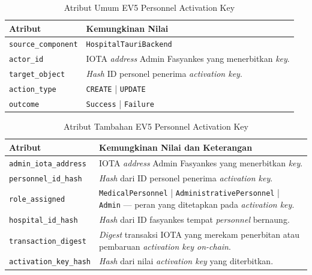 \begin{table}[htbp]
\centering
\caption{Atribut Umum EV5 Personnel Activation Key}
\label{tab:ev5-umum}
\renewcommand{\arraystretch}{1.3}
\begin{tabular}{|p{3.5cm}|p{8.5cm}|}
\hline
\textbf{Atribut} & \textbf{Kemungkinan Nilai} \\
\hline
\texttt{source\_component} &
\texttt{HospitalTauriBackend} \\
\hline
\texttt{actor\_id} &
IOTA \textit{address} Admin Fasyankes yang menerbitkan \textit{key}. \\
\hline
\texttt{target\_object} &
\textit{Hash} ID personel penerima \textit{activation key}. \\
\hline
\texttt{action\_type} &
\texttt{CREATE} | \texttt{UPDATE} \\
\hline
\texttt{outcome} &
\texttt{Success} | \texttt{Failure} \\
\hline
\end{tabular}
\end{table}

\begin{table}[htbp]
\centering
\caption{Atribut Tambahan EV5 Personnel Activation Key}
\label{tab:ev5-detail}
\renewcommand{\arraystretch}{1.3}
\begin{tabular}{|p{4cm}|p{7.5cm}|}
\hline
\textbf{Atribut} & \textbf{Kemungkinan Nilai dan Keterangan} \\
\hline
\texttt{admin\_iota\_address} &
IOTA \textit{address} Admin Fasyankes yang menerbitkan \textit{key}. \\
\hline
\texttt{personnel\_id\_hash} &
\textit{Hash} dari ID personel penerima \textit{activation key}. \\
\hline
\texttt{role\_assigned} &
\texttt{MedicalPersonnel} | \texttt{AdministrativePersonnel} | \texttt{Admin}
--- peran yang ditetapkan pada \textit{activation key}. \\
\hline
\texttt{hospital\_id\_hash} &
\textit{Hash} dari ID fasyankes tempat \textit{personnel} bernaung. \\
\hline
\texttt{transaction\_digest} &
\textit{Digest} transaksi IOTA yang merekam penerbitan atau pembaruan
\textit{activation key on-chain}. \\
\hline
\texttt{activation\_key\_hash} &
\textit{Hash} dari nilai \textit{activation key} yang diterbitkan. \\
\hline
\end{tabular}
\end{table}

